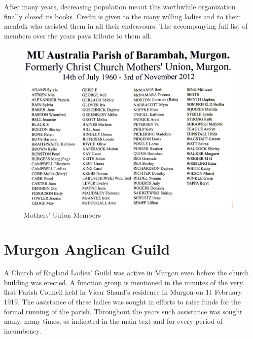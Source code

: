 After many years, decreasing population meant this worthwhile organization finally closed its books. Credit is given to the many willing ladies and to their menfolk who assisted them in all their endeavours. The accompanying full list of members over the years pays tribute to them all.









\begin{figure}[!htb]
\begin{center}
\includegraphics[width=1.\textwidth,center]{../images/MothersUnionNames.jpg}
\caption{Mothers' Union Members}
\end{center}
\end{figure}




\section{Murgon Anglican Guild}



A Church of England Ladies' Guild was active in Murgon even before the church building was erected. A function group is mentioned in the minutes of the very first Parish Council held in Vicar Shand's residence in Murgon on 11 February 1919. The assistance of these ladies was sought in efforts to raise funds for the formal running of the parish. Throughout the years such assistance was sought many, many times, as indicated in the main text and for every period of incumbency.



